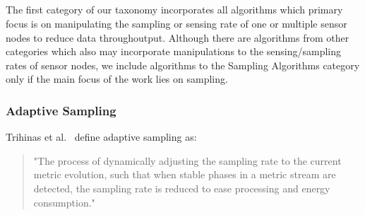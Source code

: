 \subsection{\catI} %
\label{sec:catI}

The first category of our taxonomy incorporates all algorithms which primary 
focus is on manipulating the sampling or sensing rate of one or multiple sensor
nodes to reduce data throughoutput. 
Although there are algorithms from other categories which also may incorporate
manipulations to the sensing/sampling rates of sensor nodes, we include
algorithms to the Sampling Algorithms category only if the main focus of the
work lies on sampling. 


\subsubsection{Adaptive Sampling}
\label{sec:Adaptive Sampling}

Trihinas et al.~\cite{trihinas2015adam} define adaptive sampling as:

\begin{quote}
    "The process of dynamically adjusting the sampling rate to the current
    metric evolution, such that when stable phases in a metric stream are detected,
    the sampling rate is reduced to ease processing and energy consumption."
\end{quote}

